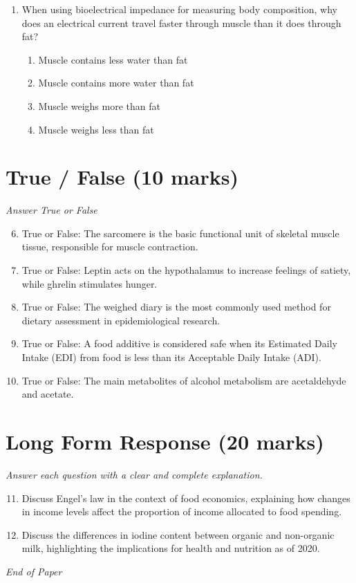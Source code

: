 \documentclass[12pt]{article}
\begin{document}
\begin{enumerate}[label=\arabic*.]
\begin{enumerate}[label=(\alph*)]
\end{enumerate}
\item When using bioelectrical impedance for measuring body composition, why does an electrical current travel faster through muscle than it does through fat?
\begin{enumerate}[label=(\alph*)]
    \item Muscle contains less water than fat
    \item Muscle contains more water than fat
    \item Muscle weighs more than fat
    \item Muscle weighs less than fat
\end{enumerate}
\end{enumerate}

\section*{True / False (10 marks)}
\textit{Answer True or False}
\begin{enumerate}[label=\arabic*.]
\setcounter{enumi}{5}
\item True or False: The sarcomere is the basic functional unit of skeletal muscle tissue, responsible for muscle contraction.
\item True or False: Leptin acts on the hypothalamus to increase feelings of satiety, while ghrelin stimulates hunger.
\item True or False: The weighed diary is the most commonly used method for dietary assessment in epidemiological research.
\item True or False: A food additive is considered safe when its Estimated Daily Intake (EDI) from food is less than its Acceptable Daily Intake (ADI).
\item True or False: The main metabolites of alcohol metabolism are acetaldehyde and acetate.
\end{enumerate}

\section*{Long Form Response (20 marks)}
\textit{Answer each question with a clear and complete explanation.}
\begin{enumerate}[label=\arabic*.]
\setcounter{enumi}{10}
\item Discuss Engel's law in the context of food economics, explaining how changes in income levels affect the proportion of income allocated to food spending.
\item Discuss the differences in iodine content between organic and non-organic milk, highlighting the implications for health and nutrition as of 2020.
\end{enumerate}

\vfill
\noindent\textit{End of Paper}
\end{document}
